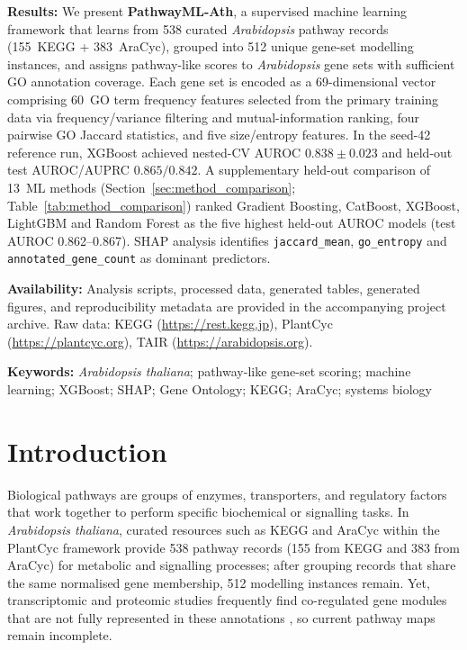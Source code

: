 \documentclass[12pt,letterpaper,oneside,openany]{book}
\begin{document}
\noindent\textbf{Results:}
We present \textbf{PathwayML-Ath}, a supervised machine learning framework that
learns from 538 curated \textit{Arabidopsis} pathway records
(155~KEGG + 383~AraCyc), grouped into 512 unique gene-set modelling instances,
and assigns pathway-like scores to \textit{Arabidopsis} gene sets with sufficient GO annotation coverage.
Each gene set is encoded as a 69-dimensional vector comprising 60~GO term frequency
features selected from the primary training data via frequency/variance filtering and mutual-information ranking,
four pairwise GO Jaccard statistics, and five size/entropy features. In the
seed-42 reference run, XGBoost achieved nested-CV AUROC $0.838 \pm 0.023$
and held-out test AUROC/AUPRC $0.865/0.842$. A supplementary held-out comparison of
13~ML methods (Section~\ref{sec:method_comparison}; Table~\ref{tab:method_comparison}) ranked
Gradient Boosting, CatBoost, XGBoost, LightGBM and Random Forest as the five highest held-out AUROC models
(test AUROC 0.862--0.867). SHAP analysis identifies
\texttt{jaccard\_mean}, \texttt{go\_entropy} and \texttt{annotated\_gene\_count} as dominant predictors.

\noindent\textbf{Availability:}
Analysis scripts, processed data, generated tables, generated figures, and reproducibility metadata are provided in the accompanying project archive.
Raw data: KEGG (\url{https://rest.kegg.jp}), PlantCyc (\url{https://plantcyc.org}),
TAIR (\url{https://arabidopsis.org}).

\noindent\textbf{Keywords:}
\textit{Arabidopsis thaliana}; pathway-like gene-set scoring; machine learning; XGBoost;
SHAP; Gene Ontology; KEGG; AraCyc; systems biology

\tableofcontents
\listoffigures
\listoftables

\mainmatter

\chapter{Introduction}
\label{sec:intro}

Biological pathways are groups of enzymes, transporters, and regulatory factors that work together to perform specific biochemical or signalling tasks. In \textit{Arabidopsis thaliana}, curated resources such as KEGG \citep{kanehisa2023kegg} and AraCyc within the PlantCyc framework \citep{hawkins2021plant} provide 538 pathway records (155 from KEGG and 383 from AraCyc) for metabolic and signalling processes; after grouping records that share the same normalised gene membership, 512 modelling instances remain. Yet, transcriptomic and proteomic studies frequently find co-regulated gene modules that are not fully represented in these annotations \citep{obayashi2018atted,usadel2009coexpression}, so current pathway maps remain incomplete.
\end{document}
